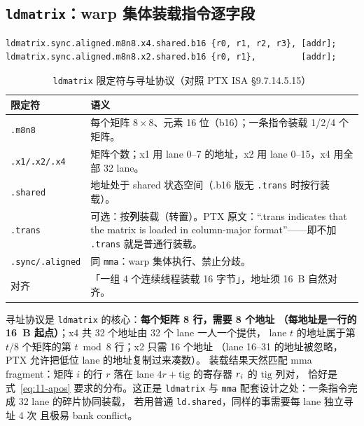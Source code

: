 \subsection{\texttt{ldmatrix}：warp 集体装载指令逐字段}

\begin{lstlisting}[language={}]
ldmatrix.sync.aligned.m8n8.x4.shared.b16 {r0, r1, r2, r3}, [addr];
ldmatrix.sync.aligned.m8n8.x2.shared.b16 {r0, r1},         [addr];
\end{lstlisting}

\begin{table}[htbp]
\centering
\caption{\texttt{ldmatrix} 限定符与寻址协议（对照 PTX ISA §9.7.14.5.15）}
\label{tab:11-ldm-fields}
\begin{tabular}{lp{10.6cm}}
\toprule
限定符 & 语义 \\
\midrule
\texttt{.m8n8} & 每个矩阵 $8\times8$、元素 16 位（b16）；一条指令装载 1/2/4 个矩阵。 \\
\texttt{.x1/.x2/.x4} & 矩阵个数；x1 用 lane 0--7 的地址，x2 用 lane 0--15，x4 用全部 32 lane。 \\
\texttt{.shared} & 地址处于 shared 状态空间（.b16 版无 \texttt{.trans} 时按行装载）。 \\
\texttt{.trans} & 可选：按\textbf{列}装载（转置）。PTX 原文：``.trans indicates that the matrix is loaded in column-major format''——即不加 \texttt{.trans} 就是普通行装载。 \\
\texttt{.\allowbreak{}sync/\allowbreak{}.\allowbreak{}aligned} & 同 \texttt{mma}：warp 集体执行、禁止分歧。 \\
对齐 & 「一组 4 个连续线程装载 16 字节」，地址须 16~B 自然对齐。 \\
\bottomrule
\end{tabular}
\end{table}

寻址协议是 \texttt{ldmatrix} 的核心：\textbf{每个矩阵 8 行，需要 8 个地址
（每地址是一行的 16~B 起点）}；x4 共 32 个地址由 32 个 lane 一人一个提供，
lane $t$ 的地址属于第 $t/8$ 个矩阵的第 $t\bmod 8$ 行；x2 只需 16 个地址
（lane 16--31 的地址被忽略，PTX 允许把低位 lane 的地址复制过来凑数）。
装载结果天然匹配 mma fragment：矩阵 $i$ 的行 $r$ 落在
lane $4r + \mathrm{tig}$ 的寄存器 $r\sb i$ 的 $\mathrm{tig}$ 列对，
恰好是式~\ref{eq:11-apos} 要求的分布。这正是 \texttt{ldmatrix} 与
\texttt{mma} 配套设计之处：一条指令完成 32 lane 的碎片协同装载，
若用普通 \texttt{ld.shared}，同样的事需要每 lane 独立寻址 4 次
且极易 bank conflict。


